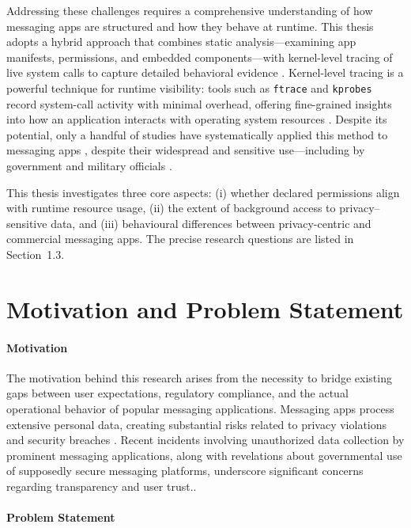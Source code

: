 \documentclass[a4paper,12pt]{report}
\begin{document}
Addressing these challenges requires a comprehensive understanding of how messaging
apps are structured and how they behave at runtime. This thesis adopts a hybrid
approach that combines static analysis—examining app manifests, permissions,
and embedded components—with kernel-level tracing of live system calls to
capture detailed behavioral evidence \cite{BPFroid2021,AOSP2024Ftrace}. Kernel-level tracing is a powerful
technique for runtime visibility: tools such as \texttt{ftrace} \cite{ftrace2023} and \texttt{kprobes} \cite{kprobes2023}
record system-call activity with minimal overhead, offering fine-grained insights
into how an application interacts with operating system resources
. Despite its potential, only a handful of
studies have systematically applied this method to messaging apps
\cite{SLR2025Messaging}, despite their widespread and sensitive use—including
by government and military officials \cite{Politico2025Signal}.

This thesis investigates three core aspects:
(i) whether declared permissions align with runtime resource usage,
(ii) the extent of background access to privacy–sensitive data, and
(iii) behavioural differences between privacy-centric and commercial messaging apps.
The precise research questions are listed in Section~1.3.

\section{Motivation and Problem Statement}

\paragraph{Motivation}
The motivation behind this research arises from the necessity to bridge existing
gaps between user expectations, regulatory compliance, and the actual operational
behavior of popular messaging applications. Messaging apps process extensive personal
data, creating substantial risks related to privacy violations and security breaches \cite{ArsTechnica2018}.
Recent incidents involving unauthorized data collection by prominent messaging
applications, along with revelations about governmental use of supposedly secure
messaging platforms, underscore significant concerns regarding transparency
and user trust.\cite{ArsTechnica2018, Reuters2021WhatsAppExodus, Politico2025Signal}.

\paragraph{Problem Statement}
\end{document}
